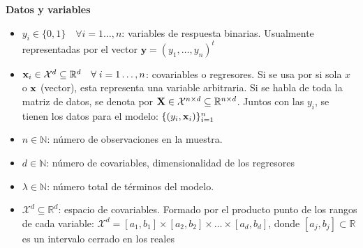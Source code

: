 \documentclass[../../Main/Main.tex]{subfiles}
\begin{document}
\textbf{Datos y variables}
\begin{itemize}[label={}]
	\item $y_i \in \{0,1\}\quad \forall i = 1\ldots,n$: variables de respuesta binarias. Usualmente representadas por el vector $\mathbf{y} = (y_1,\ldots,y_n)^t$
	\item $\mathbf{x}_i \in \mathcal{X}^d \subseteq \mathbb{R}^d\quad \forall \; i = 1\ldots,n$: covariables o regresores. Si se usa por si sola $x$ o $\mathbf{x}$ (vector), esta representa una variable arbitraria. Si se habla de toda la matriz de datos, se denota por $\mathbf{X} \in \mathcal{X}^{n\times d}\subseteq \mathbb{R}^{n\times d}$. Juntos con las $y_i$, se tienen los datos para el modelo: $\{(y_i,\mathbf{x}_i)\}_{i = 1}^n$
	\item $n \in \mathbb{N}$: número de observaciones en la muestra. 
	\item $d \in \mathbb{N}$: número de covariables, dimensionalidad de los regresores
	\item $\lambda \in \mathbb{N}$: número total de términos del modelo. 
	\item $\mathcal{X}^d \subseteq \mathbb{R}^d$: espacio de covariables. Formado por el producto punto de los rangos de cada variable: $\mathcal{X}^d = [a_1,b_1]\times[a_2,b_2]\times\ldots\times[a_d,b_d]$, donde $[a_j,b_j] \subset \mathbb{R}$ es un intervalo cerrado en los reales
\end{itemize}
\end{document}
